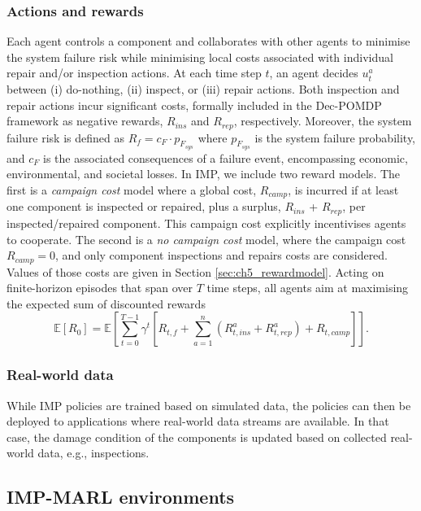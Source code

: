 \subsubsection{Actions and rewards}
Each agent controls a component and collaborates with other agents to minimise the system failure risk while minimising local costs associated with individual repair and/or inspection actions. 
At each time step $t$, an agent decides $u^a_t$ between (i) do-nothing, (ii) inspect, or (iii) repair actions.
Both inspection and repair actions incur significant costs, formally included in the Dec-POMDP framework as negative rewards, $R_{ins}$ and $R_{rep}$, respectively.
Moreover, the system failure risk is defined as $R_f= c_F \cdot p_{F_{sys}}$ where $p_{F_{sys}}$ is the system failure probability, and $c_F$ is the associated consequences of a failure event, encompassing economic, environmental, and societal losses.
In IMP, we include two reward models.
The first is a \emph{campaign cost} model where a global cost, $R_{camp}$, is incurred if at least one component is inspected or repaired, plus a surplus, $R_{ins}$ + $R_{rep}$, per inspected/repaired component.
This campaign cost explicitly incentivises agents to cooperate.
The second is a \emph{no campaign cost} model, where the campaign cost $R_{camp}=0$, and only component inspections and repairs costs are considered. 
Values of those costs are given in Section \ref{sec:ch5_rewardmodel}.
Acting on finite-horizon episodes that span over $T$ time steps, all agents aim at maximising the expected sum of discounted rewards
\begin{equation}
\label{eq:ch5_rewardimpmarl}
    \mathbb{E}[R_{0}] = \mathbb{E} \left[ \sum_{t=0}^{T-1} \gamma^t \left[ R_{t,f}+ \sum_{a=1}^n \left({R_{t,ins}^a} + {R_{t,rep}^a}\right)+R_{t,camp} \right] \right].
\end{equation}

\subsubsection{Real-world data}
While IMP policies are trained based on simulated data, the policies can then be deployed to applications where real-world data streams are available.
In that case, the damage condition of the components is updated based on collected real-world data, e.g., inspections.
 
\subsection{IMP-MARL environments}
\label{time stepsec:implement_env}

